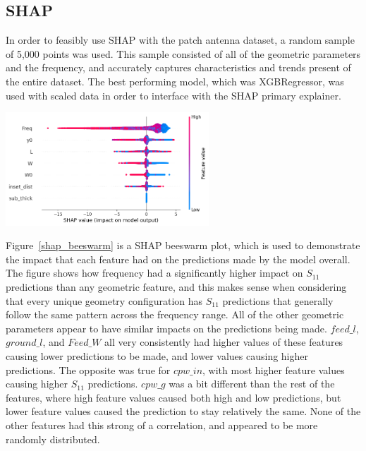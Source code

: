 \documentclass[conference]{IEEEtran}
\newenvironment{Figure}
    {\par\medskip\noindent\minipage{\linewidth}}
    {\endminipage\par\medskip}
\begin{document}
\subsection{SHAP}
In order to feasibly use SHAP with the patch antenna dataset, a random sample of 5,000 points was used. This sample consisted of all of the geometric parameters and the frequency, and accurately captures characteristics and trends present of the entire dataset. The best performing model, which was XGBRegressor, was used with scaled data in order to interface with the SHAP primary explainer. 

    
\begin{Figure}
\centering
\includegraphics[width=3in]{shap_beeswarm}
\label{shap_beeswarm}
\end{Figure}

Figure~\ref{shap_beeswarm} is a SHAP beeswarm plot, which is used to demonstrate the impact that each feature had on the predictions made by the model overall. The figure shows how frequency had a significantly higher impact on $S_{11}$ predictions than any geometric feature, and this makes sense when considering that every unique geometry configuration has $S_{11}$ predictions that generally follow the same pattern across the frequency range. All of the other geometric parameters appear to have similar impacts on the predictions being made. $feed\_l$, $ground\_l$, and $Feed\_W$ all very consistently had higher values of these features causing lower predictions to be made, and lower values causing higher predictions. The opposite was true for $cpw\_in$, with most higher feature values causing higher $S_{11}$ predictions. $cpw\_g$ was a bit different than the rest of the features, where high feature values caused both high and low predictions, but lower feature values caused the prediction to stay relatively the same. None of the other features had this strong of a correlation, and appeared to be more randomly distributed. 
\end{document}
